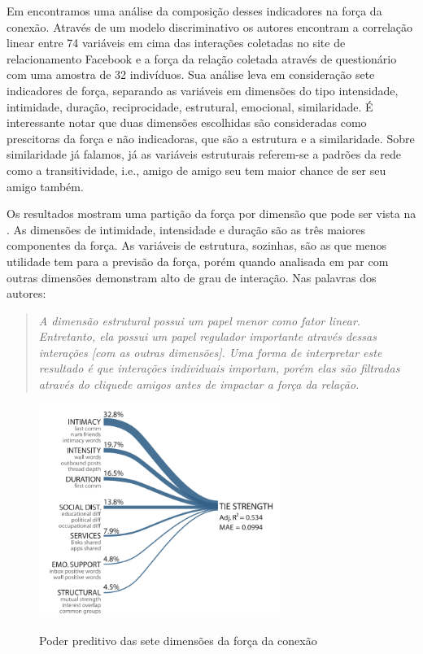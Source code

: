 Em \citet{Gilbert2009} encontramos uma análise da composição desses indicadores
na força da conexão. Através de um modelo discriminativo os autores encontram a
correlação linear entre 74 variáveis em cima das interações coletadas no site de
relacionamento Facebook e a força da relação coletada através de questionário com
uma amostra de 32 indivíduos. Sua análise leva em consideração sete indicadores
de força, separando as variáveis em dimensões do tipo intensidade, intimidade,
duração, reciprocidade, estrutural, emocional, similaridade. É interessante
notar que duas dimensões escolhidas são consideradas como prescitoras da força e
não indicadoras, que são a estrutura e a similaridade. Sobre similaridade já
falamos, já as variáveis estruturais referem-se a padrões da rede como a
transitividade, i.e., amigo de amigo seu tem maior chance de ser seu amigo
também.

Os resultados mostram uma partição da força por dimensão que pode ser vista na
. As dimensões de intimidade, intensidade e duração são
as três maiores componentes da força. As variáveis de estrutura, sozinhas, são as
que menos utilidade tem para a previsão da força, porém quando analisada em par
com outras dimensões demonstram alto de grau de interação. Nas palavras dos
autores:

	\begin{quote}{\citep{Gilbert2009}}
	\emph{A dimensão estrutural possui um papel menor como fator linear.
	Entretanto, ela possui um papel regulador importante através dessas interações
	[com as outras dimensões]. Uma forma de interpretar este resultado é que
	interações individuais importam, porém elas são filtradas através do
	clique\footnotemark de amigos antes de impactar a força da
	relação.}
	\end{quote}


\begin{figure}[h!]
  \caption{Poder preditivo das sete dimensões da força da conexão}
  \centering
    \includegraphics[width=0.7\textwidth]{imgs/composicao-forca.png}
    \label{fig:forca}
\end{figure}

